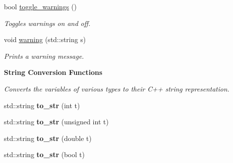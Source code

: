 \begin{DoxyCompactItemize}
$$bool \hyperlink{namespacepyne_a6dea834f084c2ff3a3c8ce67c3eaf8e1}{toggle\+\_\+warnings} ()
\begin{DoxyCompactList}\small\item\em Toggles warnings on and off. \end{DoxyCompactList}\item 
\mbox{\label{namespacepyne_ab952e7e8ee07bf181ad5439e27ae1604}} 
void \hyperlink{namespacepyne_ab952e7e8ee07bf181ad5439e27ae1604}{warning} (std\+::string s)
\begin{DoxyCompactList}\small\item\em Prints a warning message. \end{DoxyCompactList}\end{DoxyCompactItemize}
\begin{Indent}\textbf{ String Conversion Functions}\par
{\em Converts the variables of various types to their C++ string representation. }\begin{DoxyCompactItemize}
\item 
\mbox{\label{namespacepyne_a06170a309dd11535e158b0beed373b15}} 
std\+::string {\bfseries to\+\_\+str} (int t)
\item 
\mbox{\label{namespacepyne_a44e69084a0b84a3c9b811daebdaa2a61}} 
std\+::string {\bfseries to\+\_\+str} (unsigned int t)
\item 
\mbox{\label{namespacepyne_a5011c13958373a872f4de2acfbc2e128}} 
std\+::string {\bfseries to\+\_\+str} (double t)
\item 
\mbox{\label{namespacepyne_afbfb8eabf2452faf4e2a5176fec6ebe8}} 
std\+::string {\bfseries to\+\_\+str} (bool t)
\end{DoxyCompactItemize}
\end{Indent}
